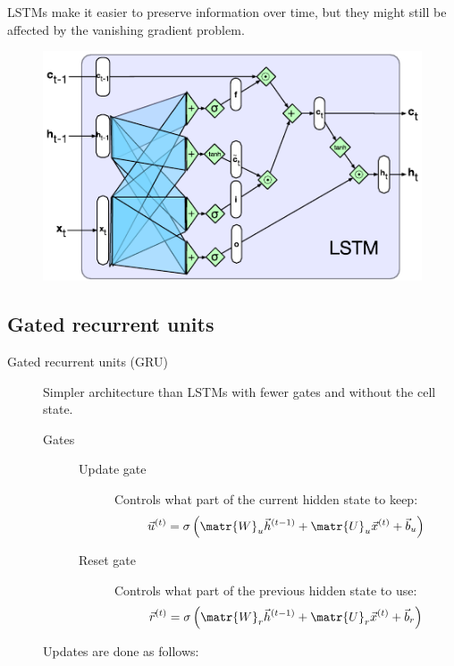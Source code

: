 \begin{description}
        \begin{remark}
            LSTMs make it easier to preserve information over time, but they might still be affected by the vanishing gradient problem.
        \end{remark}

        \begin{figure}[H]
            \centering
            \includegraphics[width=0.5\linewidth]{./img/_lstm.pdf}
        \end{figure}
\end{description}


\subsection{Gated recurrent units}

\begin{description}
    \item[Gated recurrent units (GRU)] 
        Simpler architecture than LSTMs with fewer gates and without the cell state.

        \begin{description}
            \item[Gates] \phantom{}
                \begin{description}
                    \item[Update gate] 
                        Controls what part of the current hidden state to keep:
                        \[ \vec{u}^{(t)} = \sigma\left( \matr{W}_u \vec{h}^{(t-1)} + \matr{U}_u \vec{x}^{(t)} + \vec{b}_u \right) \]
        
                    \item[Reset gate] 
                        Controls what part of the previous hidden state to use:
                        \[ \vec{r}^{(t)} = \sigma\left( \matr{W}_r \vec{h}^{(t-1)} + \matr{U}_r \vec{x}^{(t)} + \vec{b}_r \right) \]
                \end{description}
        \end{description}

        Updates are done as follows:
\end{description}

